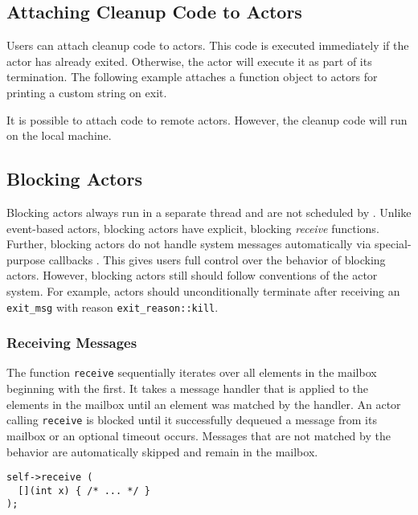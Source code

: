 
\subsection{Attaching Cleanup Code to Actors}
\label{attach}

Users can attach cleanup code to actors. This code is executed immediately if
the actor has already exited. Otherwise, the actor will execute it as part of
its termination. The following example attaches a function object to actors for
printing a custom string on exit.


It is possible to attach code to remote actors. However, the cleanup code will
run on the local machine.

\subsection{Blocking Actors}
\label{blocking-actor}

Blocking actors always run in a separate thread and are not scheduled by \lib.
Unlike event-based actors, blocking actors have explicit, blocking
\emph{receive} functions. Further, blocking actors do not handle system
messages automatically via special-purpose callbacks .
This gives users full control over the behavior of blocking actors. However,
blocking actors still should follow conventions of the actor system. For
example, actors should unconditionally terminate after receiving an
\lstinline^exit_msg^ with reason \lstinline^exit_reason::kill^.

\subsubsection{Receiving Messages}

The function \lstinline^receive^ sequentially iterates over all elements in the
mailbox beginning with the first. It takes a message handler that is applied to
the elements in the mailbox until an element was matched by the handler. An
actor calling \lstinline^receive^ is blocked until it successfully dequeued a
message from its mailbox or an optional timeout occurs. Messages that are not
matched by the behavior are automatically skipped and remain in the mailbox.

\begin{lstlisting}
self->receive (
  [](int x) { /* ... */ }
);
\end{lstlisting}

